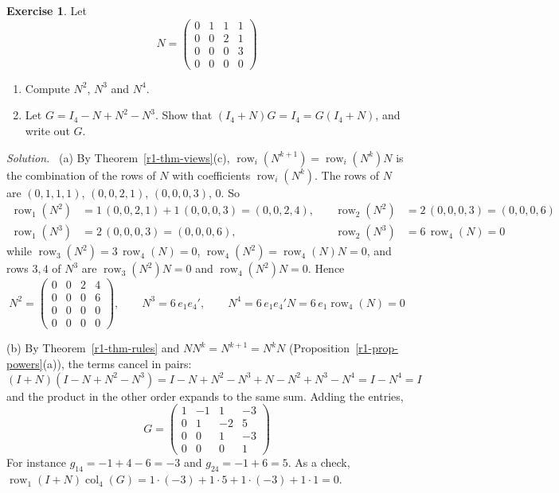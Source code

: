 \documentclass[12pt]{article}
\DeclareMathOperator{\row}{row}
\DeclareMathOperator{\col}{col}
\theoremstyle{definition}
\newtheorem{exercise}{Exercise}
\newenvironment{solution}{\par\noindent\textit{Solution.}\ }{\par\smallskip}
\begin{document}
\begin{exercise}\label{r1-ex-nilpotent}
Let
\[
N=\begin{pmatrix}0&1&1&1\\0&0&2&1\\0&0&0&3\\0&0&0&0\end{pmatrix}
\]
\begin{enumerate}
\item Compute \(N^2\), \(N^3\) and \(N^4\).
\item Let \(G=I_4-N+N^2-N^3\). Show that \((I_4+N)G=I_4=G(I_4+N)\), and write out \(G\).
\end{enumerate}
\end{exercise}
\begin{solution}
(a) By Theorem~\ref{r1-thm-views}(c), \(\row_i(N^{k+1})=\row_i(N^k)N\) is the combination of
the rows of \(N\) with coefficients \(\row_i(N^k)\). The rows of \(N\) are
\((0,1,1,1)\), \((0,0,2,1)\), \((0,0,0,3)\), \(0\). So
\[
\begin{aligned}
\row_1(N^2)&=1\,(0,0,2,1)+1\,(0,0,0,3)=(0,0,2,4), &\quad \row_2(N^2)&=2\,(0,0,0,3)=(0,0,0,6)\\
\row_1(N^3)&=2\,(0,0,0,3)=(0,0,0,6), &\quad \row_2(N^3)&=6\,\row_4(N)=0
\end{aligned}
\]
while \(\row_3(N^2)=3\,\row_4(N)=0\), \(\row_4(N^2)=\row_4(N)N=0\), and rows \(3,4\) of
\(N^3\) are \(\row_3(N^2)N=0\) and \(\row_4(N^2)N=0\). Hence
\[
N^2=\begin{pmatrix}0&0&2&4\\0&0&0&6\\0&0&0&0\\0&0&0&0\end{pmatrix},\qquad
N^3=6\,e_1e_4',\qquad N^4=6\,e_1e_4'N=6\,e_1\row_4(N)=0
\]

(b) By Theorem~\ref{r1-thm-rules} and \(NN^k=N^{k+1}=N^kN\) (Proposition~\ref{r1-prop-powers}(a)), the terms
cancel in pairs:
\[
(I+N)(I-N+N^2-N^3)=I-N+N^2-N^3+N-N^2+N^3-N^4=I-N^4=I
\]
and the product in the other order expands to the same sum. Adding the entries,
\[
G=\begin{pmatrix}1&-1&1&-3\\0&1&-2&5\\0&0&1&-3\\0&0&0&1\end{pmatrix}
\]
For instance \(g_{14}=-1+4-6=-3\) and \(g_{24}=-1+6=5\). As a check,
\(\row_1(I+N)\col_4(G)=1\cdot(-3)+1\cdot5+1\cdot(-3)+1\cdot1=0\).
\end{solution}
\end{document}
